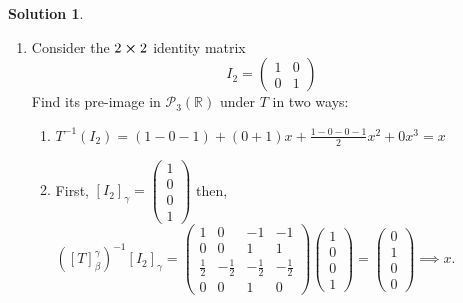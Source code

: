 \documentclass[10pt]{article}
\theoremstyle{definition}
\newtheorem{soln}{Solution}
\begin{document}
\begin{soln}
\begin{enumerate}[label=(\alph*)]
    \item Consider the $2\cross 2$ identity matrix
          $$I_2=\begin{pmatrix}
              1 & 0 \\
              0 & 1
            \end{pmatrix}$$
          Find its pre-image in $\mathcal{P}_3(\mathbb{R})$ under $T$ in two ways:
          \begin{enumerate}[label=(\roman*)]
            \item $T^{-1}(I_2)=(1-0-1)+(0+1)x+\frac{1-0-0-1}{2}x^2+0x^3=x$
            \item First, $\left[I_2\right]_\gamma=\begin{pmatrix}
                      1 \\0\\0\\1
                    \end{pmatrix}$ then,
                  $\left(\left[T\right]_\beta^\gamma\right)^{-1}\left[I_2\right]_\gamma=\begin{pmatrix}

                      1           & 0            & -1           & -1           \\
                      0           & 0            & 1            & 1            \\
                      \frac{1}{2} & -\frac{1}{2} & -\frac{1}{2} & -\frac{1}{2} \\
                      0           & 0            & 1            & 0
                    \end{pmatrix}\begin{pmatrix}
                      1 \\0\\0\\1
                    \end{pmatrix}=\begin{pmatrix}
                      0 \\1\\0\\0
                    \end{pmatrix}\implies x$.
          \end{enumerate}
  \end{enumerate}
\end{soln}
\end{document}
